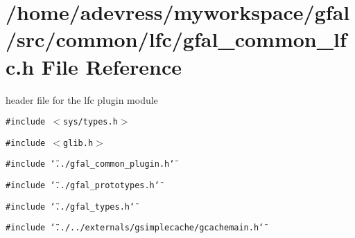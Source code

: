 \section{/home/adevress/myworkspace/gfal/src/common/lfc/gfal\_\-common\_\-lfc.h File Reference}
\label{gfal__common__lfc_8h}
header file for the lfc plugin module 

{\tt \#include $<$sys/types.h$>$}\par
{\tt \#include $<$glib.h$>$}\par
{\tt \#include \char`\"{}../gfal\_\-common\_\-plugin.h\char`\"{}}\par
{\tt \#include \char`\"{}../gfal\_\-prototypes.h\char`\"{}}\par
{\tt \#include \char`\"{}../gfal\_\-types.h\char`\"{}}\par
{\tt \#include \char`\"{}../../externals/gsimplecache/gcachemain.h\char`\"{}}\par
